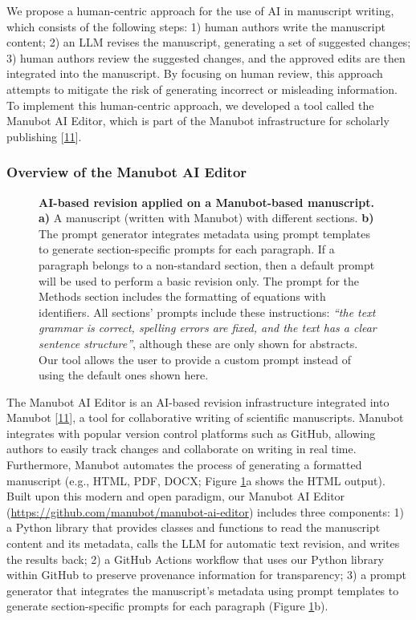 \documentclass[
]{article}
\begin{document}
We propose a human-centric approach for the use of AI in manuscript writing, which consists of the following steps:
1) human authors write the manuscript content;
2) an LLM revises the manuscript, generating a set of suggested changes;
3) human authors review the suggested changes, and the approved edits are then integrated into the manuscript.
By focusing on human review, this approach attempts to mitigate the risk of generating incorrect or misleading information.
To implement this human-centric approach, we developed a tool called the Manubot AI Editor, which is part of the Manubot infrastructure for scholarly publishing {[}\protect\hyperlink{ref-YuJbg3zO}{11}{]}.

\subsubsection{Overview of the Manubot AI Editor}

\begin{figure}
\hypertarget{fig:ai_revision}{%
\centering

\caption{\textbf{AI-based revision applied on a Manubot-based manuscript.}
\textbf{a)} A manuscript (written with Manubot) with different sections.
\textbf{b)} The prompt generator integrates metadata using prompt templates to generate section-specific prompts for each paragraph.
If a paragraph belongs to a non-standard section, then a default prompt will be used to perform a basic revision only.
The prompt for the Methods section includes the formatting of equations with identifiers.
All sections' prompts include these instructions: \emph{``the text grammar is correct, spelling errors are fixed, and the text has a clear sentence structure''}, although these are only shown for abstracts.
Our tool allows the user to provide a custom prompt instead of using the default ones shown here.}\label{fig:ai_revision}
}
\end{figure}

The Manubot AI Editor is an AI-based revision infrastructure integrated into Manubot {[}\protect\hyperlink{ref-YuJbg3zO}{11}{]}, a tool for collaborative writing of scientific manuscripts.
Manubot integrates with popular version control platforms such as GitHub, allowing authors to easily track changes and collaborate on writing in real time.
Furthermore, Manubot automates the process of generating a formatted manuscript (e.g., HTML, PDF, DOCX; Figure \ref{fig:ai_revision}a shows the HTML output).
Built upon this modern and open paradigm, our Manubot AI Editor (\url{https://github.com/manubot/manubot-ai-editor}) includes three components:
1) a Python library that provides classes and functions to read the manuscript content and its metadata, calls the LLM for automatic text revision, and writes the results back;
2) a GitHub Actions workflow that uses our Python library within GitHub to preserve provenance information for transparency;
3) a prompt generator that integrates the manuscript's metadata using prompt templates to generate section-specific prompts for each paragraph (Figure \ref{fig:ai_revision}b).
\end{document}
